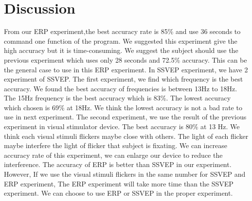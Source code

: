 \section{Discussion}
\hspace{1.5cm} From our ERP experiment,the best accuracy rate is 85\% and use 36 seconds to command one function of the program. We suggested this experiment give the high accuracy but it is time-consuming. We suggest the subject should use the previous experiment which uses only 28 seconds and 72.5\% accuracy. This can be the general case to use in this ERP experiment.
In SSVEP experiment, we have 2 experiment of SSVEP. The first experiment, we find which frequency is the best accuracy. We found the best accuracy of frequencies is between 13Hz to  18Hz. The 15Hz frequency is the best accuracy which is 83\%. The lowest accuracy which chosen is 69\% at 18Hz. We think the lowest accuracy is not a bad rate  to use in next experiment. The second experiment, we use the result of the previous experiment in visual stimulator device. The best accuracy is 80\% at 13 Hz. We think each visual stimuli flickers maybe close with others. The light of each flicker maybe interfere the light of flicker that subject is fixating. We can increase accuracy rate of this experiment, we can enlarge our device to reduce the interference. The accuracy of ERP is better than SSVEP in our experiment. However, If we use the visual stimuli flickers in the same number for SSVEP and ERP experiment, The ERP experiment will take more time than the SSVEP experiment. We can choose to use ERP or SSVEP in the proper experiment.

